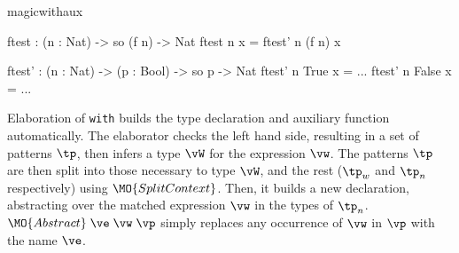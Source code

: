 \begin{SaveVerbatim}{magicwithaux}

ftest : (n : Nat) -> so (f n) -> Nat
ftest n x = ftest' n (f n) x

ftest' : (n : Nat) -> (p : Bool) -> so p -> Nat
ftest' n True  x = ... 
ftest' n False x = ... 

\end{SaveVerbatim}

\noindent
Elaboration of \texttt{with} builds the type declaration and auxiliary function
automatically. The elaborator checks the left hand side, resulting in a set of
patterns $\tp$, then infers a type $\vW$ for the expression $\vw$. The patterns
$\tp$ are then split into those necessary to type $\vW$, and the rest ($\tp_w$
and $\tp_n$ respectively) using
$\MO{SplitContext}$. Then, it builds a new declaration, abstracting over
the matched expression $\vw$ in the types of $\tp_n$.
$\MO{Abstract}\;\ve\;\vw\;\vp$ simply replaces any occurrence of $\vw$ in
$\vp$ with the name $\ve$.


